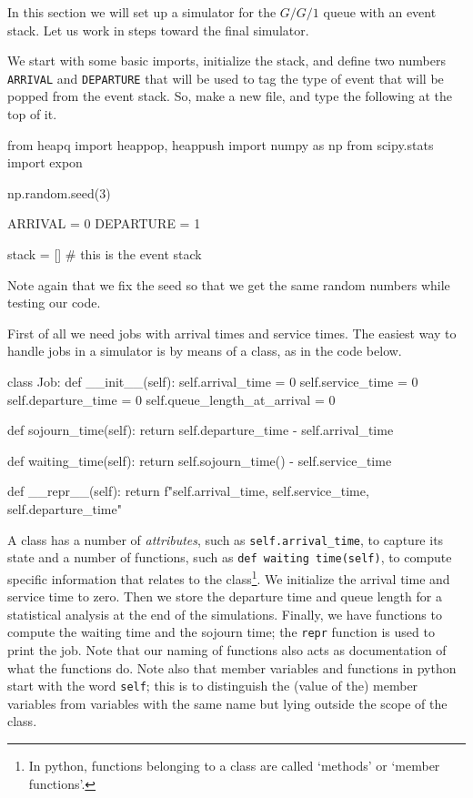 \documentclass{scrartcl}
\begin{document}
In this section we will set up a simulator for the $G/G/1$ queue with  an event stack. Let us work in steps toward the final simulator.

We start with some basic imports, initialize the stack, and define two numbers \texttt{ARRIVAL} and \texttt{DEPARTURE} that will be used to tag the type of event that will be popped from the event stack.
So, make a new file, and type the following at the top of it.

\begin{pyblock}
from heapq import heappop, heappush
import numpy as np 
from scipy.stats import expon

np.random.seed(3) 

ARRIVAL = 0
DEPARTURE = 1

stack = [] # this is the event stack
\end{pyblock}

Note again that we fix the seed so that we get the same random numbers while testing our code. 


First of all we need jobs with arrival times and service times. The easiest way to handle jobs in a simulator is by means of a class, as in the code below.


\begin{pyblock}
class Job:
    def __init__(self):
        self.arrival_time = 0
        self.service_time = 0
        self.departure_time = 0
        self.queue_length_at_arrival = 0

    def sojourn_time(self):
        return self.departure_time - self.arrival_time

    def waiting_time(self):
        return self.sojourn_time() - self.service_time

    def __repr__(self):
        return f"{self.arrival_time}, {self.service_time}, {self.departure_time}\n"

  
\end{pyblock}

A class has a number of \emph{attributes}, such as \texttt{self.arrival\_time}, to capture its state and a number of functions, such as \texttt{def waiting time(self)}, to compute specific information that relates to the class\footnote{In python, functions belonging to a class are called `methods' or `member functions'.}.
We initialize the arrival time and service time to zero.
Then we store the departure time and queue length for a statistical analysis at the end of the simulations.
Finally, we have functions to compute the waiting time and the sojourn time; the \texttt{repr} function is used to print the job.
Note that our naming of functions also acts as documentation of what the functions do.
Note also that member variables and functions in python start with the word \texttt{self}; this is to distinguish the (value of the) member variables from variables with the same name but lying outside the scope of the class.
\end{document}
